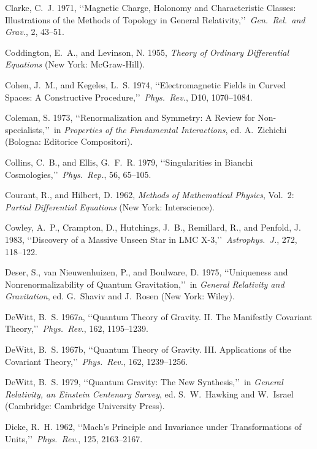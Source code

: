 \item Clarke, C.~J. 1971, \lq\lq Magnetic Charge, Holonomy and Characteristic Classes: Illustrations of the Methods of Topology in General Relativity,\rq\rq\ \emph{Gen.\ Rel.\ and Grav.}, 2, 43--51.
\item Coddington, E.~A., and Levinson, N. 1955, \emph{Theory of Ordinary Differential Equations} (New York: McGraw-Hill).
\item Cohen, J.~M., and Kegeles, L.~S. 1974, \lq\lq Electromagnetic Fields in Curved Spaces: A Constructive Procedure,\rq\rq\ \emph{Phys.\ Rev.}, D10, 1070--1084.
\item Coleman, S. 1973, \lq\lq Renormalization and Symmetry: A Review for Non-specialists,\rq\rq\ in \emph{Properties of the Fundamental Interactions}, ed. A.~Zichichi (Bologna: Editorice Compositori).
\item Collins, C.~B., and Ellis, G.~F.~R. 1979, \lq\lq Singularities in Bianchi Cosmologies,\rq\rq\ \emph{Phys.\ Rep.}, 56, 65--105.
\item Courant, R., and Hilbert, D. 1962, \emph{Methods of Mathematical Physics}, Vol.~2: \emph{Partial Differential Equations} (New York: Interscience).
\item Cowley, A.~P., Crampton, D., Hutchings, J.~B., Remillard, R., and Penfold, J. 1983, \lq\lq Discovery of a Massive Unseen Star in LMC X-3,\rq\rq\ \emph{Astrophys.\ J.}, 272, 118--122.
\item Deser, S., van Nieuwenhuizen, P., and Boulware, D. 1975, \lq\lq Uniqueness and Nonrenormalizability of Quantum Gravitation,\rq\rq\ in \emph{General Relativity and Gravitation}, ed. G.~Shaviv and J.~Rosen (New York: Wiley).
\item DeWitt, B.~S. 1967a, \lq\lq Quantum Theory of Gravity. II. The Manifestly Covariant Theory,\rq\rq\ \emph{Phys.\ Rev.}, 162, 1195--1239.
\item DeWitt, B.~S. 1967b, \lq\lq Quantum Theory of Gravity. III. Applications of the Covariant Theory,\rq\rq\ \emph{Phys.\ Rev.}, 162, 1239--1256.
\item DeWitt, B.~S. 1979, \lq\lq Quantum Gravity: The New Synthesis,\rq\rq\ in \emph{General Relativity, an Einstein Centenary Survey}, ed. S.~W.~Hawking and W.~Israel (Cambridge: Cambridge University Press).
\item Dicke, R.~H. 1962, \lq\lq Mach's Principle and Invariance under Transformations of Units,\rq\rq\ \emph{Phys.\ Rev.}, 125, 2163--2167.

